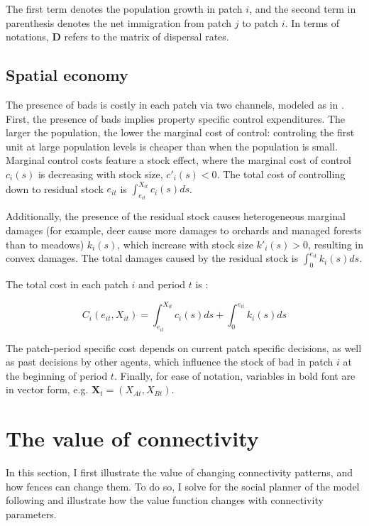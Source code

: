 The first term denotes the population growth in patch $i$, and the second term in parenthesis denotes the net immigration from patch $j$ to patch $i$. In terms of notations, $\mathbf{D}$ refers to the matrix of dispersal rates.

\subsection{Spatial economy}

The presence of bads is costly in each patch via two channels, modeled as in \cite{costello_private_2017}. First, the presence of bads implies property specific control expenditures. The larger the population, the lower the marginal cost of control: controling the first unit at large population levels is cheaper than when the population is small. Marginal control costs feature a stock effect, where the marginal cost of control $c_i(s)$ is decreasing with stock size, $c'_i(s)<0$. The total cost of controlling down to residual stock $e_{it}$ is $\int_{e_{it}}^{X_{it}}c_i(s)ds$. 

Additionally, the presence of the residual stock causes heterogeneous marginal damages (for example, deer cause more damages to orchards and managed forests  than to meadows) $k_i(s)$, which increase with stock size $k'_i(s)>0$, resulting in convex damages. The total damages caused by the residual stock is $\int_{0}^{e_{it}}k_i(s)ds$.

The total cost in each patch $i$ and period $t$ is : 

\begin{equation}
C_i(e_{it}, X_{it}) = \int_{e_{it}}^{X_{it}}c_i(s)ds + \int_{0}^{e_{it}}k_i(s)ds
\end{equation}

The patch-period specific cost depends on current patch specific decisions, as well as past decisions by other agents, which influence the stock of bad in patch $i$ at the beginning of period $t$. Finally, for ease of notation, variables in bold font are in vector form, e.g. $\mathbf{X}_t = (X_{At}, X_{Bt})$.

\section{The value of connectivity}

In this section, I first illustrate the value of changing connectivity patterns, and how fences can change them. To do so, I solve for the social planner of the model following \citep{costello_private_2017} and illustrate how the value function changes with connectivity parameters. 

